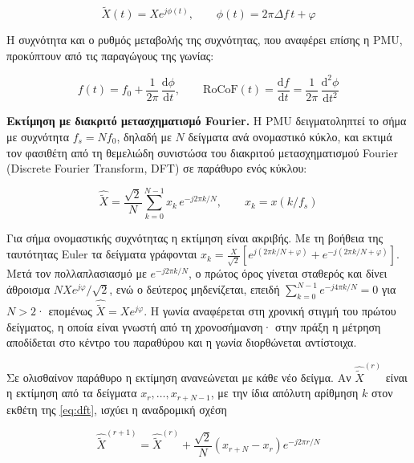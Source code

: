 \begin{equation}
\tilde{X}(t) = X e^{j\phi(t)}, \qquad \phi(t) = 2\pi\Delta f\,t + \varphi
\label{eq:rotphasor}
\end{equation}

Η συχνότητα και ο ρυθμός μεταβολής της συχνότητας, που αναφέρει επίσης η PMU, προκύπτουν
από τις παραγώγους της γωνίας:

\begin{equation}
f(t) = f_0 + \frac{1}{2\pi}\,\frac{\mathrm{d}\phi}{\mathrm{d}t}, \qquad
\mathrm{RoCoF}(t) = \frac{\mathrm{d}f}{\mathrm{d}t}
= \frac{1}{2\pi}\,\frac{\mathrm{d}^2\phi}{\mathrm{d}t^2}
\label{eq:pmufreq}
\end{equation}

\textbf{Εκτίμηση με διακριτό μετασχηματισμό Fourier.} Η PMU δειγματοληπτεί το σήμα με
συχνότητα $f_s = N f_0$, δηλαδή με $N$ δείγματα ανά ονομαστικό κύκλο, και εκτιμά τον
φασιθέτη από τη θεμελιώδη συνιστώσα του διακριτού μετασχηματισμού Fourier (Discrete Fourier
Transform, DFT) σε παράθυρο ενός κύκλου:

\begin{equation}
\hat{\tilde{X}} = \frac{\sqrt{2}}{N} \sum_{k=0}^{N-1} x_k\, e^{-j 2\pi k / N},
\qquad x_k = x(k/f_s)
\label{eq:dft}
\end{equation}

Για σήμα ονομαστικής συχνότητας η εκτίμηση είναι ακριβής. Με τη βοήθεια της ταυτότητας
Euler τα δείγματα γράφονται
$x_k = \frac{X}{\sqrt{2}}\left[e^{j(2\pi k/N + \varphi)} + e^{-j(2\pi k/N + \varphi)}\right]$.
Μετά τον πολλαπλασιασμό με $e^{-j2\pi k/N}$, ο πρώτος όρος γίνεται σταθερός και δίνει
άθροισμα $N X e^{j\varphi}/\sqrt{2}$, ενώ ο δεύτερος μηδενίζεται, επειδή
$\sum_{k=0}^{N-1} e^{-j4\pi k/N} = 0$ για $N > 2$· επομένως $\hat{\tilde{X}} = X e^{j\varphi}$.
Η γωνία αναφέρεται στη χρονική στιγμή του πρώτου δείγματος, η οποία είναι γνωστή από τη
χρονοσήμανση· στην πράξη η μέτρηση αποδίδεται στο κέντρο του παραθύρου και η γωνία
διορθώνεται αντίστοιχα.

Σε ολισθαίνον παράθυρο η εκτίμηση ανανεώνεται με κάθε νέο δείγμα. Αν $\hat{\tilde{X}}^{(r)}$
είναι η εκτίμηση από τα δείγματα $x_r, \ldots, x_{r+N-1}$, με την ίδια απόλυτη αρίθμηση
$k$ στον εκθέτη της \eqref{eq:dft}, ισχύει η αναδρομική σχέση

\begin{equation}
\hat{\tilde{X}}^{(r+1)} = \hat{\tilde{X}}^{(r)}
+ \frac{\sqrt{2}}{N}\left(x_{r+N} - x_r\right) e^{-j2\pi r/N}
\label{eq:recdft}
\end{equation}

